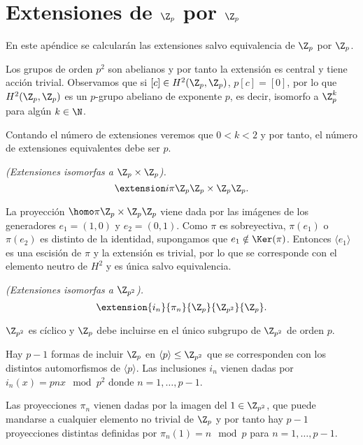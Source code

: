 \chapter{Extensiones de $\Z_p$ por $\Z_p$}


	En este apéndice se calcularán las extensiones salvo equivalencia de $\Z_p$ por $\Z_p$. %
	
	Los grupos de orden $p^2$ son abelianos y por tanto la extensión es central y tiene acción trivial.
	Observamos que si $[c]\in H^2(\Z_p,\Z_p)$, $p[c] = [0]$, por lo que $H^2(\Z_p,\Z_p)$ es un $p$-grupo abeliano de exponente $p$, es decir, isomorfo a $\Z_p^k$ para algún $k\in \N$.
	
	Contando el número de extensiones veremos que $0<k<2$ y por tanto, el número de extensiones equivalentes debe ser $p$.
	
	\textit{(Extensiones isomorfas a $\Z_p\times \Z_p$).}
	\begin{equation*}
		\extension i \pi {\Z_p} {\Z_p\times \Z_p} {\Z_p}.
	\end{equation*}
	
	La proyección $\homo \pi {\Z_p\times \Z_p} {\Z_p}$ viene dada por las imágenes de los generadores $e_1=(1,0)$ y $e_2=(0,1)$. Como $\pi$ es sobreyectiva, $\pi(e_1)$ o $\pi(e_2)$ es distinto de la identidad, supongamos que $e_1\notin \Ker(\pi)$. Entonces $\langle e_1 \rangle$ es una escisión de $\pi$ y la extensión es trivial, por lo que se corresponde con el elemento neutro de $H^2$ y es única salvo equivalencia.
	
	\textit{(Extensiones isomorfas a $\Z_{p^2}$).}
	\begin{equation*}
		\extension {i_n} {\pi_n} {\Z_p} {\Z_{p^2}} {\Z_p}.
	\end{equation*}
	
	$\Z_{p^2}$ es cíclico y $\Z_p$ debe incluirse en el único subgrupo de $\Z_{p^2}$ de orden $p$. 
	
	Hay $p-1$ formas de incluir $\Z_p$ en $\langle p \rangle \leq \Z_{p^2}$ que se corresponden con los distintos automorfismos de $\langle p \rangle$. Las inclusiones $i_n$ vienen dadas por $i_n(x) = pnx \mod p^2$ donde $n=1,\ldots,p-1$.
	
	Las proyecciones $\pi_n$ vienen dadas por la imagen del $1\in \Z_{p^2}$, que puede mandarse a cualquier elemento no trivial de $\Z_p$ y por tanto hay $p-1$ proyecciones distintas definidas por $\pi_n(1) = n \mod p$ para $n=1,\ldots, p-1$.
	
